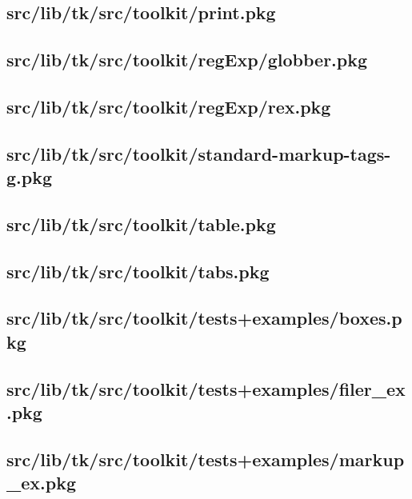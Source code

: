 \subsection{src/lib/tk/src/toolkit/print.pkg}


\subsection{src/lib/tk/src/toolkit/regExp/globber.pkg}


\subsection{src/lib/tk/src/toolkit/regExp/rex.pkg}


\subsection{src/lib/tk/src/toolkit/standard-markup-tags-g.pkg}


\subsection{src/lib/tk/src/toolkit/table.pkg}


\subsection{src/lib/tk/src/toolkit/tabs.pkg}


\subsection{src/lib/tk/src/toolkit/tests+examples/boxes.pkg}


\subsection{src/lib/tk/src/toolkit/tests+examples/filer\_ex.pkg}


\subsection{src/lib/tk/src/toolkit/tests+examples/markup\_ex.pkg}


